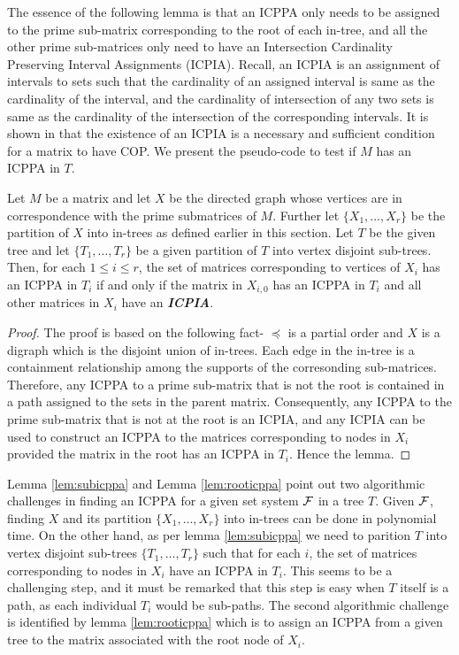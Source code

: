 \documentclass{llncs}
\def\cF{{\cal F}}
\begin{document}
 The essence of the following lemma is that an ICPPA only needs to be assigned to the prime sub-matrix corresponding to the root of each in-tree, and all the other prime sub-matrices only need to have an Intersection Cardinality Preserving Interval Assignments (ICPIA).  Recall, an ICPIA is an assignment of intervals to sets such that the cardinality of an assigned interval is same as the cardinality of the interval, and the cardinality of intersection of any two sets is same as the cardinality of the intersection of the corresponding intervals.  It is shown in \cite{nsnrs09} that the existence of an ICPIA is a necessary and sufficient condition for a matrix to have COP. 
We present the pseudo-code to test if $M$ has an ICPPA in $T$. 
\begin{lemma} \label{lem:rooticppa}
Let $M$ be a matrix and let $X$ be the directed graph whose vertices are in correspondence with the prime submatrices of $M$.  Further let $\{X_1,\ldots,X_r\}$ be the partition of $X$ into in-trees as defined earlier in this section.
Let $T$ be the given tree and let $\{T_1, \ldots, T_r\}$ be a given partition of $T$ into vertex disjoint sub-trees.
Then, for each $1 \leq i \leq r$, the set of matrices corresponding to vertices of $X_i$ has an ICPPA in $T_i$ if and only if the matrix in $X_{i,0}$ has an ICPPA in $T_i$ and all other matrices in $X_i$ have an {\bf {\em ICPIA}}.
\end{lemma}
\begin{proof}
The proof is based on the following fact- $\preccurlyeq$ is a partial order and $X$ is a digraph which is the disjoint
union of in-trees.  Each edge in the in-tree is a containment relationship among the supports of the corresonding sub-matrices. Therefore, any ICPPA to a prime sub-matrix that is not the root is contained in a path assigned to the sets in the parent matrix.  Consequently, any ICPPA to the prime sub-matrix that is not at the root is an ICPIA, and any ICPIA can be used to construct an ICPPA to the matrices corresponding to nodes in $X_i$ provided the matrix in the root has an ICPPA in $T_i$.   Hence the lemma.
\end{proof}
Lemma \ref{lem:subicppa} and Lemma \ref{lem:rooticppa} point out two algorithmic challenges in finding an ICPPA for a given set system $\cF$ in a tree $T$.  Given $\cF$, finding $X$ and its partition $\{X_1,\ldots,X_r\}$ into in-trees can be done in polynomial time.  On the other hand, as per lemma \ref{lem:subicppa} we need to parition $T$ into vertex disjoint sub-trees $\{T_1, \ldots, T_r\}$ such that for each $i$, the set of matrices corresponding  to nodes in $X_i$ have an ICPPA in $T_i$.  This seems to be a challenging step, and it must be remarked that this step is easy when $T$ itself is a path, as each individual $T_i$ would be sub-paths.  The second algorithmic challenge is identified by lemma \ref{lem:rooticppa} which is to assign an ICPPA from a given tree to the matrix associated with the root node of $X_i$.  
\end{document}

